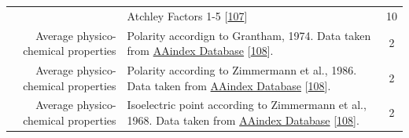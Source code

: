 \documentclass[12pt,a4paper,twoside]{book}
\theoremstyle{definition}
\theoremstyle{definition}
\theoremstyle{remark}
\begin{document}
\begin{longtable}[]{@{}rlc@{}}
\begin{minipage}[t]{0.23\columnwidth}
\end{minipage} & \begin{minipage}[t]{0.50\columnwidth}\raggedright\strut
Atchley Factors 1-5 {[}\protect\hyperlink{ref-Atchley2005}{107}{]}\strut
\end{minipage} & \begin{minipage}[t]{0.18\columnwidth}\centering\strut
10\strut
\end{minipage}\tabularnewline
\begin{minipage}[t]{0.23\columnwidth}\raggedleft\strut
Average physico-chemical properties\strut
\end{minipage} & \begin{minipage}[t]{0.50\columnwidth}\raggedright\strut
Polarity accordign to Grantham, 1974. Data taken from
\href{http://www.genome.jp/dbget-bin/www_bget?aaindex:GRAR740102}{AAindex
Database} {[}\protect\hyperlink{ref-Kawashima2008}{108}{]}.\strut
\end{minipage} & \begin{minipage}[t]{0.18\columnwidth}\centering\strut
2\strut
\end{minipage}\tabularnewline
\begin{minipage}[t]{0.23\columnwidth}\raggedleft\strut
Average physico-chemical properties\strut
\end{minipage} & \begin{minipage}[t]{0.50\columnwidth}\raggedright\strut
Polarity according to Zimmermann et al., 1986. Data taken from
\href{http://www.genome.jp/dbget-bin/www_bget?aaindex:ZIMJ680103}{AAindex
Database} {[}\protect\hyperlink{ref-Kawashima2008}{108}{]}.\strut
\end{minipage} & \begin{minipage}[t]{0.18\columnwidth}\centering\strut
2\strut
\end{minipage}\tabularnewline
\begin{minipage}[t]{0.23\columnwidth}\raggedleft\strut
Average physico-chemical properties\strut
\end{minipage} & \begin{minipage}[t]{0.50\columnwidth}\raggedright\strut
Isoelectric point according to Zimmermann et al., 1968. Data taken from
\href{http://www.genome.jp/dbget-bin/www_bget?aaindex:ZIMJ680104}{AAindex
Database} {[}\protect\hyperlink{ref-Kawashima2008}{108}{]}.\strut
\end{minipage} & \begin{minipage}[t]{0.18\columnwidth}\centering\strut
2\strut
\end{minipage}\tabularnewline

\end{longtable}
\end{document}
